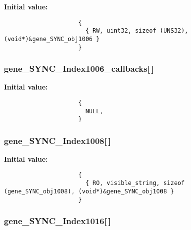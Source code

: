 \textbf{Initial value:}

\begin{Code}\begin{verbatim} 
                     {
                       { RW, uint32, sizeof (UNS32), (void*)&gene_SYNC_obj1006 }
                     }
\end{verbatim}\end{Code}
\subsubsection{ {\bf gene\_\-SYNC\_\-Index1006\_\-callbacks}[$\,$]}\label{objdict_8c_cc8e910887c7e8b12ec5584c8e49c39c}


\textbf{Initial value:}

\begin{Code}\begin{verbatim} 
                     {
                       NULL,
                     }
\end{verbatim}\end{Code}
\subsubsection{ {\bf gene\_\-SYNC\_\-Index1008}[$\,$]}\label{objdict_8c_7fdc859dc72c78b892e2fafa0c50be3f}


\textbf{Initial value:}

\begin{Code}\begin{verbatim} 
                     {
                       { RO, visible_string, sizeof (gene_SYNC_obj1008), (void*)&gene_SYNC_obj1008 }
                     }
\end{verbatim}\end{Code}
\subsubsection{ {\bf gene\_\-SYNC\_\-Index1016}[$\,$]}\label{objdict_8c_7c9115f6c30b19aa4f9f5ca04c946350}


